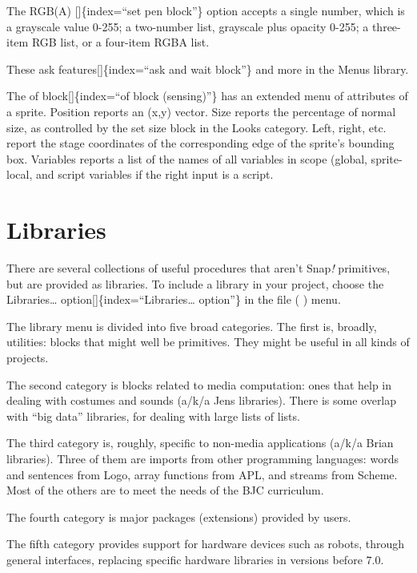 \documentclass[
  letterpaper,
]{book}
\begin{document}
The RGB(A) {[}{]}\{index=``set pen block''\} option accepts a single
number, which is a grayscale value 0-255; a two-number list, grayscale
plus opacity 0-255; a three-item RGB list, or a four-item RGBA list.

These ask features{[}{]}\{index=``ask and wait block''\} and more in the
Menus library.

The of block{[}{]}\{index=``of block (sensing)''\} has an extended menu
of attributes of a sprite. Position reports an (x,y) vector. Size
reports the percentage of normal size, as controlled by the set size
block in the Looks category. Left, right, etc. report the stage
coordinates of the corresponding edge of the sprite's bounding box.
Variables reports a list of the names of all variables in scope (global,
sprite-local, and script variables if the right input is a script.

\section{Libraries}\label{libraries}

\label{libraries-1}{}There are several collections of
useful procedures that aren't Snap\emph{!} primitives, but are provided
as libraries. To include a library in your project, choose the
Libraries\ldots{} option{[}{]}\{index=``Libraries\ldots{} option''\} in
the file ( ) menu.

The library menu is divided into five broad categories. The first is,
broadly, utilities: blocks that might well be primitives. They might be
useful in all kinds of projects.

The second category is blocks related to media computation: ones that
help in dealing with costumes and sounds (a/k/a Jens libraries). There
is some overlap with ``big data'' libraries, for dealing with large
lists of lists.

The third category is, roughly, specific to non-media applications
(a/k/a Brian libraries). Three of them are imports from other
programming languages: words and sentences from Logo, array functions
from APL, and streams from Scheme. Most of the others are to meet the
needs of the BJC curriculum.

The fourth category is major packages (extensions) provided by users.

The fifth category provides support for hardware devices such as robots,
through general interfaces, replacing specific hardware libraries in
versions before 7.0.
\end{document}
